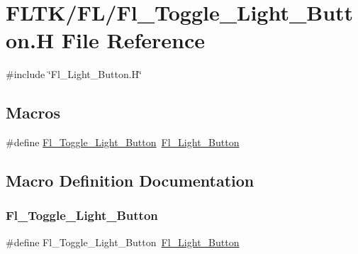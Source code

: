 \hypertarget{_fl___toggle___light___button_8_h}{}\section{F\+L\+T\+K/\+F\+L/\+Fl\+\_\+\+Toggle\+\_\+\+Light\+\_\+\+Button.H File Reference}
\label{_fl___toggle___light___button_8_h}
{\ttfamily \#include \char`\"{}Fl\+\_\+\+Light\+\_\+\+Button.\+H\char`\"{}}\newline
\subsection*{Macros}
\begin{DoxyCompactItemize}
\item 
\#define \hyperlink{_fl___toggle___light___button_8_h_a1e38098f48277babb4851ade93349adb}{Fl\+\_\+\+Toggle\+\_\+\+Light\+\_\+\+Button}~\hyperlink{class_fl___light___button}{Fl\+\_\+\+Light\+\_\+\+Button}
\end{DoxyCompactItemize}


\subsection{Macro Definition Documentation}
\mbox{\label{_fl___toggle___light___button_8_h_a1e38098f48277babb4851ade93349adb}} 
\subsubsection{\texorpdfstring{Fl\+\_\+\+Toggle\+\_\+\+Light\+\_\+\+Button}{Fl\_Toggle\_Light\_Button}}
{\footnotesize\ttfamily \#define Fl\+\_\+\+Toggle\+\_\+\+Light\+\_\+\+Button~\hyperlink{class_fl___light___button}{Fl\+\_\+\+Light\+\_\+\+Button}}

